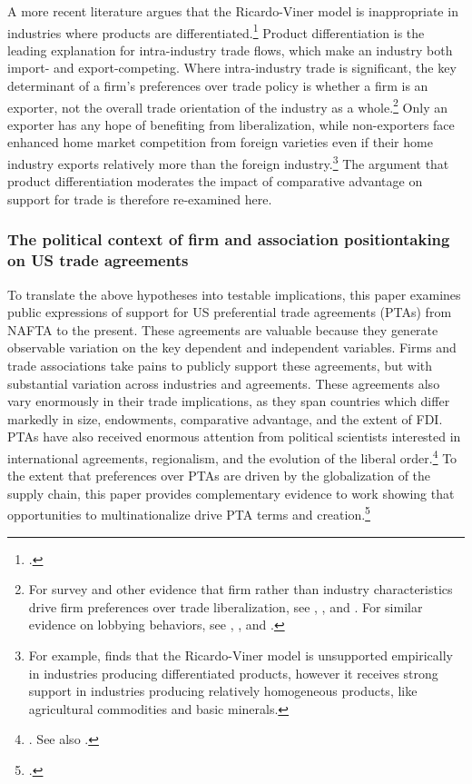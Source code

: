 \documentclass[hidelinks,12pt,letter]{article}
\begin{document}
A more recent literature argues that the Ricardo-Viner model is  inappropriate in industries where products are differentiated.\footnote{\citealt{osgood2016differentiated}.} 
Product differentiation is the leading explanation for intra-industry trade flows, which make an industry both import- and export-competing. Where intra-industry trade is significant, the key determinant of a firm's preferences over trade policy is whether a firm  is an exporter, not the overall trade orientation of the industry as a whole.\footnote{For survey and other evidence that firm rather than industry characteristics drive firm preferences over trade liberalization, see \citealt{plouffe2016firm}, \citealt{osgood2017charmed}, and \citealt{plouffe2012new}. For similar evidence on lobbying behaviors, see \citealt{madeira2014new}, \citealt{osgood2017breakdown}, \citealt{kim2017political} and \citealt{osgood2017industrial}.} Only an exporter has any hope of benefiting from liberalization, while non-exporters face enhanced home market competition from foreign varieties even if their home industry exports relatively more than the foreign industry.\footnote{For example, \citealt{osgood2017breakdown} 
finds that the Ricardo-Viner model is unsupported empirically in industries producing differentiated products, however it receives strong support in industries producing relatively homogeneous products, like agricultural commodities and basic minerals.} The argument that product differentiation moderates the impact of comparative advantage on support for trade is therefore re-examined here. 

\subsubsection*{The political context of firm and association positiontaking on US trade agreements}
To translate the above hypotheses into testable implications, this paper examines public expressions of support for US preferential trade agreements (PTAs) from NAFTA to the present. These agreements are valuable because they generate observable variation on the key dependent and independent variables. Firms and trade associations take pains to publicly support these agreements, but with substantial variation across industries and agreements. %
These agreements also vary enormously in their trade implications, as they span countries which differ markedly in size, endowments, comparative advantage, and the extent of FDI. PTAs have also received enormous attention from political scientists interested in international agreements, regionalism, and the evolution of the liberal order.\footnote{\citealt{dur2014design, milner1997industries, mansfield2007vetoing}. See also \citealt{mansfield2002democracies, whalley1998countries,buthe2008politics,baccini2015investment}.} To the extent that preferences over PTAs are driven by the globalization of the supply chain, this paper provides complementary evidence to work showing that opportunities to multinationalize drive PTA terms and creation.\footnote{\citealt{manger2012vertical, manger2005competition, manger2014economic}.}
\end{document}
